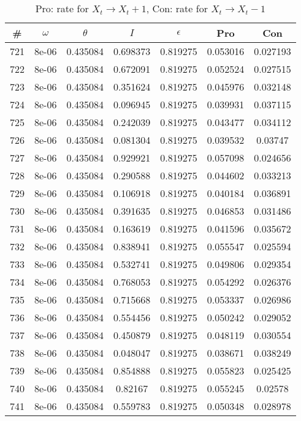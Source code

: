 \begin{table}
\caption{Pro: rate for $X_t \rightarrow X_t + 1$, Con: rate for $X_t \rightarrow X_t - 1$}
\begin{tabular*}{\linewidth}{c|c|c|c|c|c|c}
\# & $\omega$ & $\theta$ & $I$ & $\epsilon$ & Pro & Con \\
\hline
721 & 8e-06 & 0.435084 & 0.698373 & 0.819275 & 0.053016 & 0.027193\\
722 & 8e-06 & 0.435084 & 0.672091 & 0.819275 & 0.052524 & 0.027515\\
723 & 8e-06 & 0.435084 & 0.351624 & 0.819275 & 0.045976 & 0.032148\\
724 & 8e-06 & 0.435084 & 0.096945 & 0.819275 & 0.039931 & 0.037115\\
725 & 8e-06 & 0.435084 & 0.242039 & 0.819275 & 0.043477 & 0.034112\\
726 & 8e-06 & 0.435084 & 0.081304 & 0.819275 & 0.039532 & 0.03747\\
727 & 8e-06 & 0.435084 & 0.929921 & 0.819275 & 0.057098 & 0.024656\\
728 & 8e-06 & 0.435084 & 0.290588 & 0.819275 & 0.044602 & 0.033213\\
729 & 8e-06 & 0.435084 & 0.106918 & 0.819275 & 0.040184 & 0.036891\\
730 & 8e-06 & 0.435084 & 0.391635 & 0.819275 & 0.046853 & 0.031486\\
731 & 8e-06 & 0.435084 & 0.163619 & 0.819275 & 0.041596 & 0.035672\\
732 & 8e-06 & 0.435084 & 0.838941 & 0.819275 & 0.055547 & 0.025594\\
733 & 8e-06 & 0.435084 & 0.532741 & 0.819275 & 0.049806 & 0.029354\\
734 & 8e-06 & 0.435084 & 0.768053 & 0.819275 & 0.054292 & 0.026376\\
735 & 8e-06 & 0.435084 & 0.715668 & 0.819275 & 0.053337 & 0.026986\\
736 & 8e-06 & 0.435084 & 0.554456 & 0.819275 & 0.050242 & 0.029052\\
737 & 8e-06 & 0.435084 & 0.450879 & 0.819275 & 0.048119 & 0.030554\\
738 & 8e-06 & 0.435084 & 0.048047 & 0.819275 & 0.038671 & 0.038249\\
739 & 8e-06 & 0.435084 & 0.854888 & 0.819275 & 0.055823 & 0.025425\\
740 & 8e-06 & 0.435084 & 0.82167 & 0.819275 & 0.055245 & 0.02578\\
741 & 8e-06 & 0.435084 & 0.559783 & 0.819275 & 0.050348 & 0.028978\\

\end{tabular*}
\end{table}
